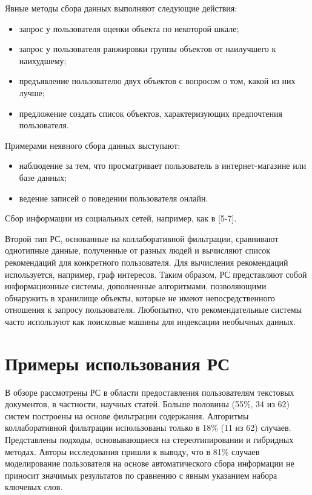 \documentclass[a4paper,14pt,openany,final]{extreport} %
\begin{document}
Явные методы сбора данных выполняют следующие действия:
\begin{itemize}
\item запрос у пользователя оценки объекта по некоторой шкале;
\item запрос у пользователя ранжировки группы объектов от наилучшего к наихудшему;
\item предъявление пользователю двух объектов с вопросом о том, какой из них лучше;
\item предложение создать список объектов, характеризующих предпочтения пользователя.
\end{itemize}
Примерами неявного сбора данных выступают:

\begin{itemize}
\item наблюдение за тем, что просматривает пользователь в
  интернет-магазине или базе данных;
\item ведение записей о поведении
  пользователя онлайн.
\end{itemize}
Сбор информации из социальных сетей, например, как в [5-7].

Второй тип РС, основанные на коллаборативной фильтрации, сравнивают однотипные данные, полученные от разных людей и вычисляют список рекомендаций для конкретного пользователя. Для вычисления рекомендаций используется, например, граф интересов. Таким образом, РС представляют собой информационные системы, дополненные алгоритмами, позволяющими обнаружить в хранилище объекты, которые не имеют непосредственного отношения к запросу пользователя. Любопытно, что рекомендательные системы часто используют как поисковые машины для индексации необычных данных.




\section{Примеры использования РС}
\label{sec:rs-examples}

В обзоре \cite{b8} рассмотрены РС в области предоставления пользователям текстовых документов, в частности, научных статей. Больше половины (55\%, 34 из 62) систем построены на основе фильтрации содержания. Алгоритмы коллаборативной фильтрации использованы только в 18\% (11 из 62) случаев. Представлены подходы, основывающиеся на стереотипировании и гибридных методах. Авторы исследования пришли к выводу, что в 81\% случаев моделирование пользователя на основе автоматического сбора информации не приносит значимых результатов по сравнению с явным указанием набора ключевых слов.
\end{document}
